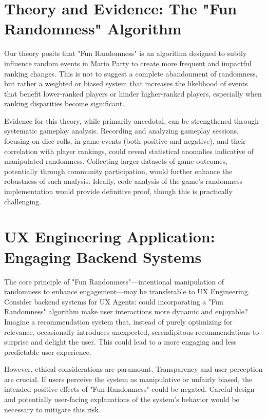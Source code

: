 \documentclass{article}
\begin{document}
\section{Theory and Evidence: The "Fun Randomness" Algorithm}

Our theory posits that "Fun Randomness" is an algorithm designed to subtly influence random events in Mario Party to create more frequent and impactful ranking changes. This is not to suggest a complete abandonment of randomness, but rather a weighted or biased system that increases the likelihood of events that benefit lower-ranked players or hinder higher-ranked players, especially when ranking disparities become significant.

Evidence for this theory, while primarily anecdotal, can be strengthened through systematic gameplay analysis.  Recording and analyzing gameplay sessions, focusing on dice rolls, in-game events (both positive and negative), and their correlation with player rankings, could reveal statistical anomalies indicative of manipulated randomness.  Collecting larger datasets of game outcomes, potentially through community participation, would further enhance the robustness of such analysis.  Ideally, code analysis of the game's randomness implementation would provide definitive proof, though this is practically challenging.

\section{UX Engineering Application: Engaging Backend Systems}

The core principle of "Fun Randomness"—intentional manipulation of randomness to enhance engagement—may be transferable to UX Engineering.  Consider backend systems for UX Agents: could incorporating a "Fun Randomness" algorithm make user interactions more dynamic and enjoyable?  Imagine a recommendation system that, instead of purely optimizing for relevance, occasionally introduces unexpected, serendipitous recommendations to surprise and delight the user.  This could lead to a more engaging and less predictable user experience.

However, ethical considerations are paramount.  Transparency and user perception are crucial.  If users perceive the system as manipulative or unfairly biased, the intended positive effects of "Fun Randomness" could be negated.  Careful design and potentially user-facing explanations of the system's behavior would be necessary to mitigate this risk.
\end{document}
